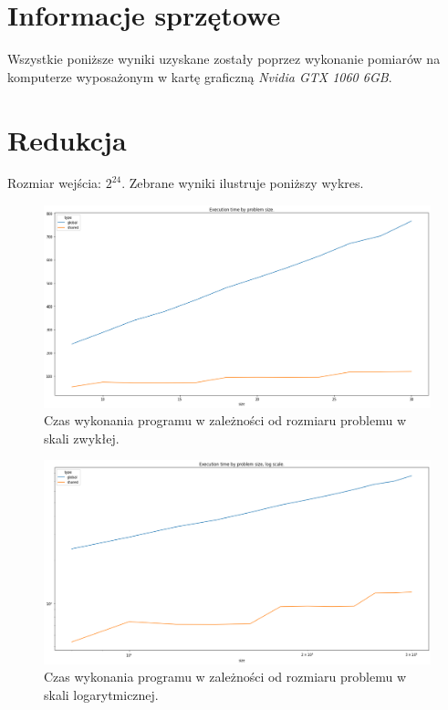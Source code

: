 \documentclass{article}
\begin{document}
    \section{Informacje sprzętowe}
    Wszystkie poniższe wyniki uzyskane zostały poprzez wykonanie pomiarów na komputerze wyposażonym w kartę graficzną \textit{Nvidia GTX 1060 6GB}.
    
    \section{Redukcja}
    Rozmiar wejścia: $2^{24}$. Zebrane wyniki ilustruje poniższy wykres.
        \begin{figure}[htb]
            \centering
            \includegraphics[width=\textwidth]{cuda/Lab3/report/images/exec_time.png}
            \caption{Czas wykonania programu w zależności od rozmiaru problemu w skali zwykłej.}
        \end{figure}
        \begin{figure}[htb]
            \centering
            
            \includegraphics[width=\textwidth]{cuda/Lab3/report/images/exec_time_log.png}
            \caption{Czas wykonania programu w zależności od rozmiaru problemu w skali logarytmicznej.}
        \end{figure}
        
\end{document}
